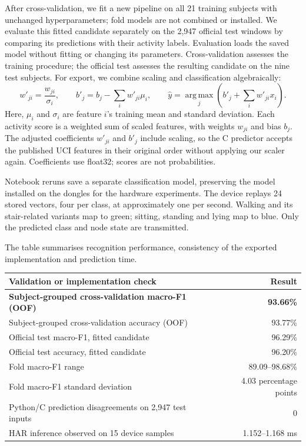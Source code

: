 \documentclass[11pt,a4paper]{article}
\begin{document}
After cross-validation, we fit a new pipeline on all 21 training subjects with unchanged hyperparameters; fold models are not combined or installed. We evaluate this fitted candidate separately on the 2,947 official test windows by comparing its predictions with their activity labels. Evaluation loads the saved model without fitting or changing its parameters. Cross-validation assesses the training procedure; the official test assesses the resulting candidate on the nine test subjects. For export, we combine scaling and classification algebraically:
\[
 w'_{ji}=\frac{w_{ji}}{\sigma_i},\qquad
 b'_j=b_j-\sum_i w'_{ji}\mu_i,\qquad
 \hat y=\operatorname*{arg\,max}_j\left(b'_j+\sum_i w'_{ji}x_i\right).
\]
Here, $\mu_i$ and $\sigma_i$ are feature $i$'s training mean and standard deviation. Each activity score is a weighted sum of scaled features, with weights $w_{ji}$ and bias $b_j$. The adjusted coefficients $w'_{ji}$ and $b'_j$ include scaling, so the C predictor accepts the published UCI features in their original order without applying our scaler again. Coefficients use float32; scores are not probabilities.

Notebook reruns save a separate classification model, preserving the model installed on the dongles for the hardware experiments. The device replays 24 stored vectors, four per class, at approximately one per second. Walking and its stair-related variants map to green; sitting, standing and lying map to blue. Only the predicted class and node state are transmitted.

The table summarises recognition performance, consistency of the exported implementation and prediction time.

\begin{tabularx}{\linewidth}{@{}Yr@{}}
\toprule
Validation or implementation check & Result\\
\midrule
\textbf{Subject-grouped cross-validation macro-F1 (OOF)} & \textbf{93.66\%}\\
Subject-grouped cross-validation accuracy (OOF) & 93.77\%\\
Official test macro-F1, fitted candidate & 96.29\%\\
Official test accuracy, fitted candidate & 96.20\%\\
Fold macro-F1 range & 89.09--98.68\%\\
Fold macro-F1 standard deviation & 4.03 percentage points\\
Python/C prediction disagreements on 2,947 test inputs & 0\\
HAR inference observed on 15 device samples & 1.152--1.168 ms\\
\bottomrule
\end{tabularx}
\end{document}
